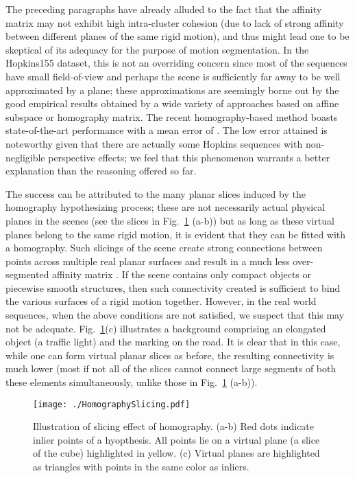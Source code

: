 \documentclass[10pt,twocolumn,letterpaper]{article}
\begin{document}
The preceding paragraphs have already alluded to the fact that the affinity matrix  may not exhibit high intra-cluster cohesion (due to lack of strong affinity between different planes of the same rigid motion), and thus might lead one to be skeptical of its adequacy for the purpose of motion segmentation. In the Hopkins155 dataset, this is not an overriding concern since most of the sequences have small field-of-view and perhaps the scene is sufficiently far away to be well approximated by a plane; these approximations are seemingly borne out by the good empirical results obtained by a wide variety of approaches based on affine subspace or homography matrix. The recent homography-based method \cite{Lai2017} boasts state-of-the-art performance with a mean error of . The low error attained is noteworthy given that there are actually some Hopkins sequences with non-negligible perspective effects; we feel that this phenomenon warrants a better explanation than the reasoning offered so far. 

The success can be attributed to the many planar slices induced by the homography hypothesizing process; these are not necessarily actual physical planes in the scenes (see the slices in Fig.~\ref{fig:planar_slice} (a-b)) but as long as these virtual planes belong to the same rigid motion, it is evident that they can be fitted with a homography. Such slicings of the scene create strong connections between points across multiple real planar surfaces and result in a much less over-segmented affinity matrix . If the scene contains only compact objects or piecewise smooth structures, then such connectivity created is sufficient to bind the various surfaces of a rigid motion together. However, in the real world sequences, when the above conditions are not satisfied, we suspect that this may not be adequate. Fig.~\ref{fig:planar_slice}(c) illustrates a background comprising an elongated object (a traffic light) and the marking on the road. It is clear that in this case, while one can form virtual planar slices as before, the resulting connectivity is much lower (most if not all of the slices cannot connect large segments of both these elements simultaneously, unlike those in Fig.~\ref{fig:planar_slice} (a-b)).



\begin{figure}[!ht]
\begin{center}
\texttt{[image: ./HomographySlicing.pdf]}
\caption{Illustration of slicing effect of homography. (a-b) Red dots indicate inlier points of a hyopthesis. All points lie on a virtual plane (a slice of the cube) highlighted in yellow. (c) Virtual planes are highlighted as triangles with points in the same color as inliers. } \label{fig:planar_slice}
\vspace{-0.9cm}
\end{center}
\end{figure}
\end{document}
